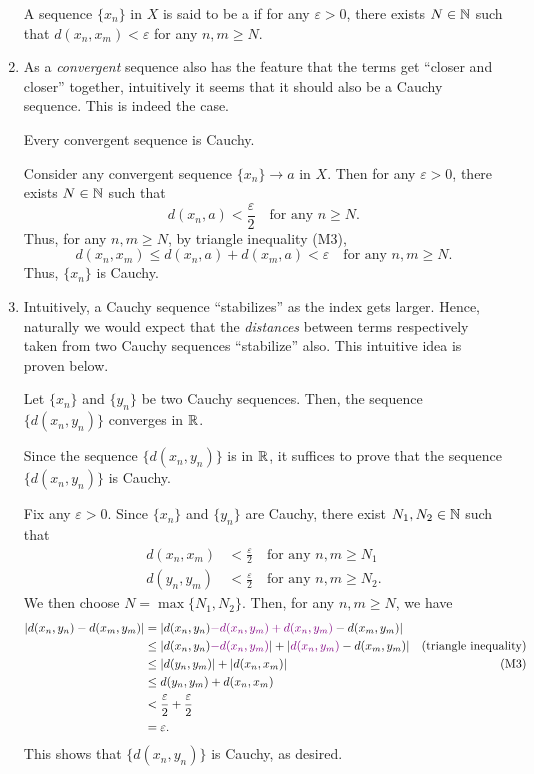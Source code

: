 \begin{enumerate}
A sequence \(\{x_n\}\) in \(X\) is said to be a  if for
any \(\varepsilon>0\), there exists \(N\in\mathbb{N}\) such that
\(d(x_n,x_m)<\varepsilon\) for any \(n,m\ge N\).

\item As a \emph{convergent} sequence also has the feature that the terms get
``closer and closer'' together, intuitively it seems that it should also be a
Cauchy sequence. This is indeed the case.

\begin{proposition}
\label{prp:conv-imp-cauchy}
Every convergent sequence is Cauchy.
\end{proposition}
\begin{pf}
Consider any convergent sequence \(\{x_n\}\to a\) in \(X\). Then for any
\(\varepsilon>0\), there exists \(N\in\mathbb{N}\) such that
\[
d(x_n,a)<\frac{\varepsilon}{2}\quad\text{for any \(n\ge N\)}.
\]
Thus, for any \(n,m\ge N\), by triangle inequality (M3),
\[
d(x_n,x_m)\le d(x_n,a)+d(x_m,a)<\varepsilon\quad\text{for any \(n,m\ge N\)}.
\]
Thus, \(\{x_n\}\) is Cauchy.
\end{pf}

\item Intuitively, a Cauchy sequence ``stabilizes'' as the index gets larger.
Hence, naturally we would expect that the \emph{distances} between terms
respectively taken from two Cauchy sequences ``stabilize'' also. This intuitive
idea is proven below.

\begin{proposition}
\label{prp:dist-cauchy-conv}
Let \(\{x_n\}\) and \(\{y_n\}\) be two Cauchy sequences. Then, the sequence
\(\{d(x_n,y_n)\}\) converges in \(\mathbb{R}\).
\end{proposition}
\begin{pf}
Since the sequence \(\{d(x_n,y_n)\}\) is in \(\mathbb{R}\), it suffices to prove that
the sequence \(\{d(x_n,y_n)\}\) is Cauchy.

Fix any \(\varepsilon>0\). Since \(\{x_n\}\) and \(\{y_n\}\) are Cauchy, there
exist \(N_1,N_2\in\mathbb{N}\) such that
\begin{align*}
d(x_n,x_m)&<\frac{\varepsilon}{2}\quad\text{for any \(n,m\ge N_1\)}\\
d(y_n,y_m)&<\frac{\varepsilon}{2}\quad\text{for any \(n,m\ge N_2\)}.
\end{align*}
We then choose \(N=\max\{N_1,N_2\}\). Then, for any \(n,m\ge N\), we have
\begin{align*}
|d(x_n,y_n)-d(x_m,y_m)|
&= |d(x_n,y_n){\color{violet}-d(x_n,y_m)+d(x_n,y_m)}-d(x_m,y_m)|\\
&\le |d(x_n,y_n){\color{violet}-d(x_n,y_m)}|+|{\color{violet}d(x_n,y_m)}-d(x_m,y_m)|&\text{(triangle inequality)}\\
&\le |d(y_n,y_m)|+|d(x_n,x_m)|&\text{(M3)}\\
&\le d(y_n,y_m)+d(x_n,x_m)\\
&<\frac{\varepsilon}{2}+\frac{\varepsilon}{2}\\
&=\varepsilon.
\end{align*}
This shows that \(\{d(x_n,y_n)\}\) is Cauchy, as desired.
\end{pf}


\end{enumerate}
